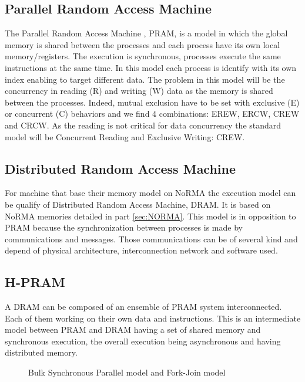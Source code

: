 \subsection{Parallel Random Access Machine}
The Parallel Random Access Machine \cite{fortune1978parallelism}, PRAM, is a model in which the global memory is shared between the processes and each process have its own local memory/registers.
The execution is synchronous, processes execute the same instructions at the same time. 
In this model each process is identify with its own index enabling to target different data. 
The problem in this model will be the concurrency in reading (R) and writing (W) data as the memory is shared between the processes.
Indeed, mutual exclusion have to be set with exclusive (E) or concurrent (C) behaviors and we find 4 combinations: EREW, ERCW, CREW and CRCW.
As the reading is not critical for data concurrency the standard model will be Concurrent Reading and Exclusive Writing: CREW.

\subsection{Distributed Random Access Machine}
For machine that base their memory model on NoRMA the execution model can be qualify of Distributed Random Access Machine, DRAM.
It is based on NoRMA memories detailed in part \ref{sec:NORMA}.
This model is in opposition to PRAM because the synchronization between processes is made by communications and messages. 
Those communications can be of several kind and depend of physical architecture, interconnection network and software used.

\subsection{H-PRAM}
A DRAM can be composed of an ensemble of PRAM system interconnected. 
Each of them working on their own data and instructions. 
This is an intermediate model between PRAM and DRAM having a set of shared memory and synchronous execution, the overall execution being asynchronous and having distributed memory.

\begin{figure}
\begin{center}

\end{center}
\caption{Bulk Synchronous Parallel model and Fork-Join model}
\label{fig:3_SOFT:bsp_fj}
\end{figure}


